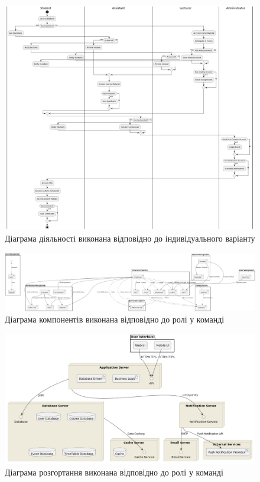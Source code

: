 \documentclass[oneside,14pt]{extarticle}
\begin{document}
\begin{normalsize}
	\begin{figure}[H]
		\centering
		\includegraphics[width=\textwidth]{activity}
		\caption{Діаграма діяльності виконана відповідно до індивідуального варіанту}
	\end{figure}
	
	\begin{figure}[H]
		\centering
		\includegraphics[width=\textwidth]{component}
		\caption{Діаграма компонентів виконана відповідно до ролі у команді}
	\end{figure}
	
	\begin{figure}[H]
		\centering
		\includegraphics[width=\textwidth]{deployment}
		\caption{Діаграма розгортання виконана відповідно до ролі у команді}
	\end{figure}
	

\end{normalsize}
\end{document}
